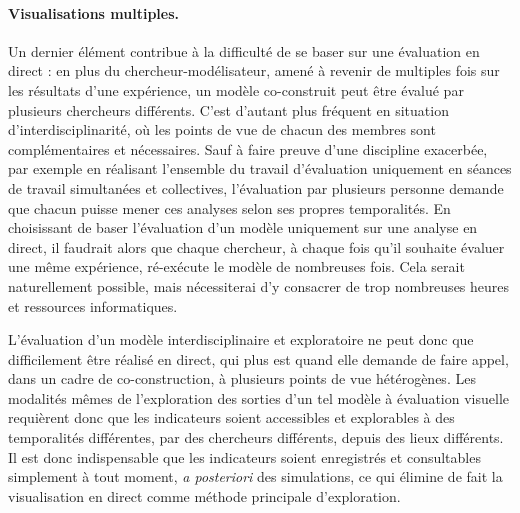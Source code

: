 \paragraph{Visualisations multiples.}

Un dernier élément contribue à la difficulté de se baser sur une évaluation en direct : en plus du chercheur-modélisateur, amené à revenir de multiples fois sur les résultats d'une expérience, un modèle co-construit peut être évalué par plusieurs chercheurs différents.
C'est d'autant plus fréquent en situation d'interdisciplinarité, où les points de vue de chacun des membres sont complémentaires et nécessaires.
Sauf à faire preuve d'une discipline exacerbée, par exemple en réalisant l'ensemble du travail d'évaluation uniquement en séances de travail simultanées et collectives, l'évaluation par plusieurs personne demande que chacun puisse mener ces analyses selon ses propres temporalités.
En choisissant de baser l'évaluation d'un modèle uniquement sur une analyse en direct, il faudrait alors que chaque chercheur, à chaque fois qu'il souhaite évaluer une même expérience, ré-exécute le modèle de nombreuses fois.
Cela serait naturellement possible, mais nécessiterai d'y consacrer de trop nombreuses heures et ressources informatiques.

L'évaluation d'un modèle interdisciplinaire et exploratoire ne peut donc que difficilement être réalisé en direct, qui plus est quand elle demande de faire appel, dans un cadre de co-construction, à plusieurs points de vue hétérogènes.
Les modalités mêmes de l'exploration des sorties d'un tel modèle à évaluation visuelle requièrent donc que les indicateurs soient accessibles et explorables à des temporalités différentes, par des chercheurs différents, depuis des lieux différents.
Il est donc indispensable que les indicateurs soient enregistrés et consultables simplement à tout moment, \textit{a posteriori} des simulations, ce qui élimine de fait la visualisation \og en direct\fg{} comme méthode principale d'exploration.


